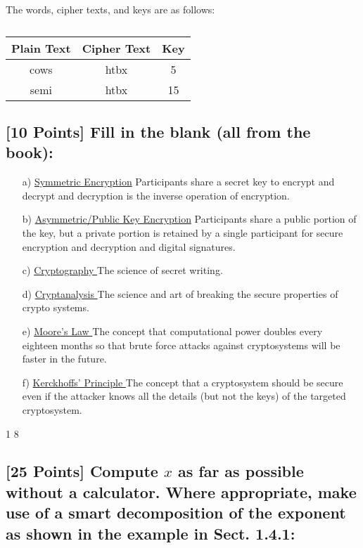 \documentclass{article}
\begin{document}
The words, cipher texts, and keys are as follows:

\begin{table}[h!]
\centering
\begin{tabular}{|c|c|c|} \hline
\textbf{Plain Text} & \textbf{Cipher Text} & \textbf{Key}  \\ \hline
cows & htbx & 5 \\ \hline
semi & htbx & 15 \\ \hline
\end{tabular}
\caption*{}
\end{table}

\subsection*{[10 Points] Fill in the blank (all from the book):}

\begin{enumerate}
  \setlength{\itemsep}{20pt}
  \item[a)] \underline{ Symmetric Encryption}  Participants share a secret key to encrypt and decrypt and decryption is the inverse operation of encryption.
  \item[b)]  \underline{ Asymmetric/Public Key Encryption} Participants share a public portion of the key, but a private portion is retained by a single participant for secure encryption and decryption and digital signatures.
  \item[c)] \underline{ Cryptography } The science of secret writing.
  \item[d)] \underline{ Cryptanalysis } The science and art of breaking the secure properties of crypto systems.
  \item[e)] \underline{ Moore's Law } The concept that computational power doubles every eighteen months so that brute force attacks against cryptosystems will be faster in the future.
  \item[f)] \underline{ Kerckhoffs' Principle } The concept that a cryptosystem should be secure even if the attacker knows all the details (but not the keys) of the targeted cryptosystem.
  \item[]
\end{enumerate}

\setcounter{section} {1}
\setcounter{subsection} {8}
\subsection{[25 Points] Compute $x$ as far as possible without a calculator. Where appropriate, make use of a smart decomposition of the exponent as shown in the example in Sect. 1.4.1:}
\end{document}
